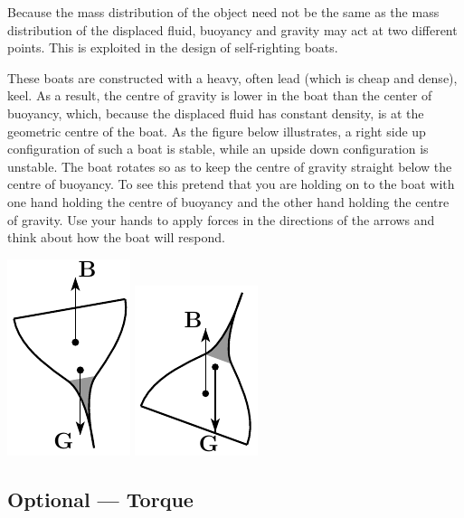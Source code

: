 \noindent
Because the mass distribution of the object need not be the same as the
mass distribution of the displaced fluid, buoyancy and gravity may act at 
two different points. This is exploited in the design of self-righting boats.
 
These boats are constructed with a heavy, often lead (which is cheap and dense), keel.  As a result, the centre of gravity is lower in the boat 
than the center of buoyancy, which, because the displaced fluid has constant density, is at the geometric centre of the boat. As the figure below illustrates, 
a right side up configuration of such a boat is stable, while an upside down 
configuration is unstable. The boat rotates so as to keep the centre
of gravity straight below the centre of buoyancy. To see this pretend that
you are holding on to the boat with one hand holding the centre of buoyancy
and the other hand holding the centre of gravity. Use your hands to apply forces
in the directions of the arrows and think about how the boat will respond.

\begin{efig}
\begin{center}
    \includegraphics{boatU.pdf}\qquad\qquad\qquad
    \includegraphics{boatD.pdf}
\end{center}
\end{efig}

\subsection{Optional --- Torque}\label{sec:torque}

